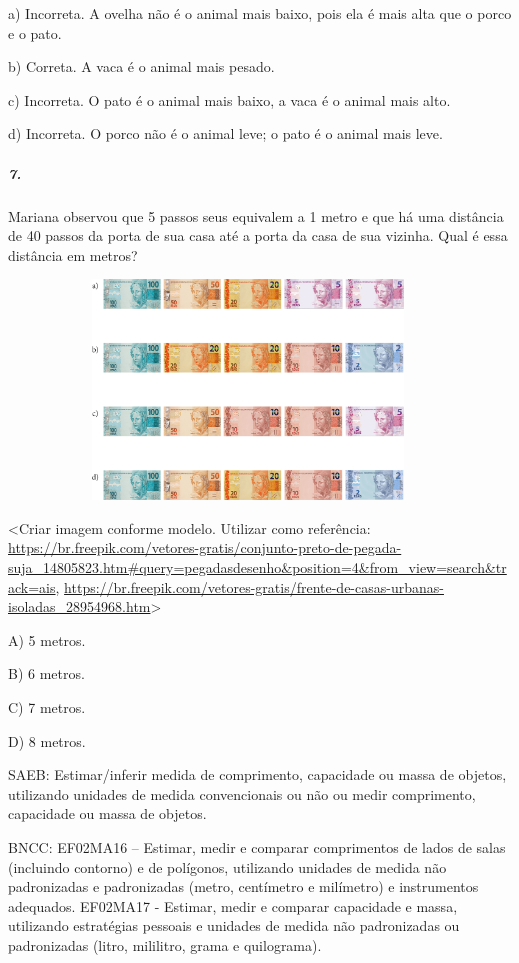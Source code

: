 a) Incorreta. A ovelha não é o animal mais baixo, pois ela é mais alta
que o porco e o pato.

b) Correta. A vaca é o animal mais pesado.

c) Incorreta. O pato é o animal mais baixo, a vaca é o animal mais alto.

d) Incorreta. O porco não é o animal leve; o pato é o animal mais leve.

\subparagraph{7. }\label{section-106}

Mariana observou que 5 passos seus equivalem a 1 metro e que há uma
distância de 40 passos da porta de sua casa até a porta da casa de sua vizinha. Qual é essa distância em metros?

\includegraphics[width=5.00000in,height=2.30208in]{media/image115.png}

\textless{}Criar imagem conforme modelo. Utilizar como referência:
\url{https://br.freepik.com/vetores-gratis/conjunto-preto-de-pegada-suja_14805823.htm\#query=pegadasdesenho\&position=4\&from_view=search\&track=ais},
\url{https://br.freepik.com/vetores-gratis/frente-de-casas-urbanas-isoladas_28954968.htm}\textgreater{}

A) 5 metros.

B) 6 metros.

C) 7 metros.

D) 8 metros.

SAEB: Estimar/inferir medida de comprimento, capacidade ou massa
de objetos, utilizando unidades de medida convencionais ou não ou medir
comprimento, capacidade ou massa de objetos.

BNCC: EF02MA16 -- Estimar, medir e comparar comprimentos de lados de
salas (incluindo contorno) e de polígonos, utilizando unidades de medida
não padronizadas e padronizadas (metro, centímetro e milímetro) e
instrumentos adequados. EF02MA17 - Estimar, medir e comparar capacidade
e massa, utilizando estratégias pessoais e unidades de medida não
padronizadas ou padronizadas (litro, mililitro, grama e quilograma).

